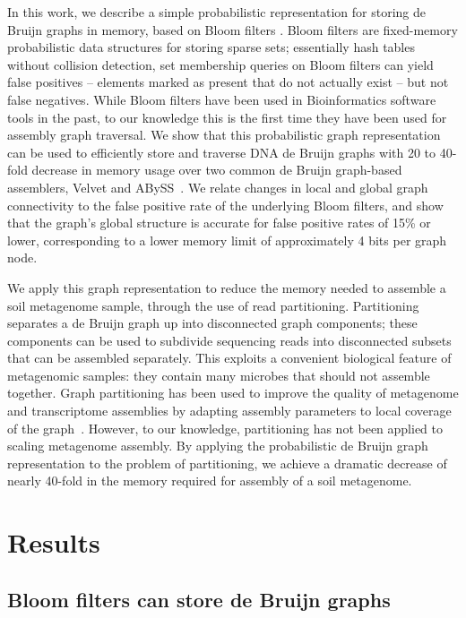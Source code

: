 \documentclass{pnastwo}
\begin{document}
\begin{article}
In this work, we describe a simple probabilistic representation for
storing de Bruijn graphs in memory, based on Bloom filters
\cite{bloom}.  Bloom filters are fixed-memory probabilistic data
structures for storing sparse sets; essentially hash tables without collision
detection, set membership queries on Bloom filters can yield false
positives -- elements marked as present that do not actually exist --
but not false negatives. While Bloom filters have been used in Bioinformatics 
software tools in the 
past\cite{bloomref1,bloomref2,bloomref3,bloomref4}, to our knowledge this is 
the first time they have been used for assembly graph traversal. We show that 
this probabilistic graph
representation can be used to efficiently store and traverse DNA de
Bruijn graphs with 20 to 40-fold decrease in memory usage
over two common de Bruijn graph-based assemblers, Velvet
and ABySS~\cite{velvet,abyss}. We relate 
changes in local and
global graph connectivity to the false positive rate of the underlying
Bloom filters, and show that the graph's global structure is accurate
for false positive rates of 15\% or lower, 
corresponding to a lower memory limit of approximately
4 bits per graph node.

We apply this graph representation to reduce the memory needed
to assemble a soil metagenome sample, through
the use of read partitioning.  Partitioning separates a de Bruijn graph up
into disconnected graph components; these components can be used to
subdivide sequencing reads into disconnected subsets that can be
assembled separately.
This exploits a convenient biological
feature of metagenomic samples: they contain many microbes that should
not assemble together.  Graph partitioning has
been used to improve the quality of metagenome and transcriptome assemblies
by adapting assembly parameters to local coverage of the graph~\cite{metavelvet,pubmed21685107,trinity}.  However, to our knowledge, partitioning has not been applied
to scaling metagenome assembly. By applying the
probabilistic de Bruijn graph representation to the problem of
partitioning, we achieve a dramatic decrease of nearly 40-fold in the memory
required for assembly of a soil metagenome.


\section{Results}

\subsection{Bloom filters can store de Bruijn graphs}


\end{article}
\end{document}
